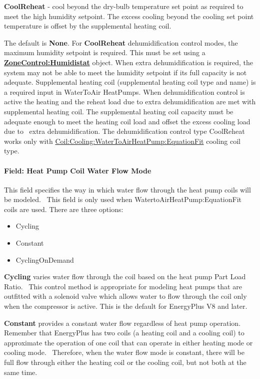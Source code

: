 \textbf{CoolReheat} - cool beyond the dry-bulb temperature set point as required to meet the high humidity setpoint. The excess cooling beyond the cooling set point temperature is offset by the supplemental heating coil.

The default is \textbf{None}. For \textbf{CoolReheat} dehumidification control modes, the maximum humidity setpoint is required. This must be set using a \textbf{\hyperref[zonecontrolhumidistat]{ZoneControl:Humidistat}} object. When extra dehumidification is required, the system may not be able to meet the humidity setpoint if its full capacity is not adequate. Supplemental heating coil (supplemental heating coil type and name) is a required input in WaterToAir HeatPumps. When dehumidification control is active the heating and the reheat load due to extra dehumidification are met with supplemental heating coil. The supplemental heating coil capacity must be adequate enough to meet the heating coil load and offset the excess cooling load due to~ extra dehumidification. The dehumidification control type CoolReheat works only with \hyperref[coilcoolingwatertoairheatpumpequationfit]{Coil:Cooling:WaterToAirHeatPump:EquationFit} cooling coil type.

\paragraph{Field: Heat Pump Coil Water Flow Mode}\label{field-heat-pump-coil-water-flow-mode-000}

This field specifies the way in which water flow through the heat pump coils will be modeled.~ This field is only used when WatertoAirHeatPump:EquationFit coils are used. There are three options:

\begin{itemize}
\item
  Cycling
\item
  Constant
\item
  CyclingOnDemand
\end{itemize}

\textbf{Cycling} varies water flow through the coil based on the heat pump Part Load Ratio.~ This control method is appropriate for modeling heat pumps that are outfitted with a solenoid valve which allows water to flow through the coil only when the compressor is active. This is the default for EnergyPlus V8 and later.

\textbf{Constant} provides a constant water flow regardless of heat pump operation.~ Remember that EnergyPlus has two coils (a heating coil and a cooling coil) to approximate the operation of one coil that can operate in either heating mode or cooling mode.~ Therefore, when the water flow mode is constant, there will be full flow through either the heating coil or the cooling coil, but not both at the same time.

